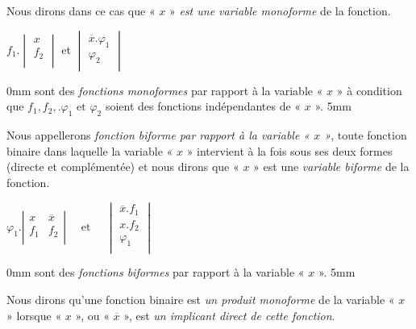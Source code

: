 Nous dirons dans ce cas que « $x$ » \emph {est une variable monoforme} de la fonction.



 
 \centerline{ $f_1 .  \begin{vmatrix} x \\ f_2 \\
                               \end{vmatrix}$   et  $ 
                               \begin{vmatrix} \overline{x} . {\varphi}_1 \\  {\varphi}_2 \\
                               \end{vmatrix}$  }
 

  
\setlength {\parindent} {0mm}  
sont des \emph{fonctions monoformes} par rapport à la variable « $x$ » à condition que $f_1, f_2, . {\varphi}_1 \text{ et } {\varphi}_2 $ soient des fonctions indépendantes de  « $x$ ». 
\setlength {\parindent} {5mm}

Nous appellerons \emph{fonction biforme par rapport à la variable « $x$ »}, toute fonction binaire dans laquelle la variable « $x$ » intervient à la fois sous ses deux formes (directe et complémentée) et nous dirons que « $x$ » est une \emph{variable biforme} de la fonction.  




 \centerline{ $ {\varphi}_1 .   \left| \begin{array}{c|c} x  & \overline{x}\\ f_1 & f_2 \\
\end{array} \right| \quad \text{ et } \quad 
                               \begin{vmatrix} \overline{x} . f_1 \\
                               x . f_2 \\
                                  {\varphi}_1 \\
                               \end{vmatrix}$  }
 

 
\setlength {\parindent} {0mm}  
sont des \emph{fonctions biformes} par rapport à la variable « $x$ ».
\setlength {\parindent} {5mm} 


Nous dirons qu'une fonction binaire est \emph{un produit monoforme} de la variable « $x$ » lorsque « $x$ », ou « $\overline{x}$ », est \emph{un implicant direct de cette fonction}. 

